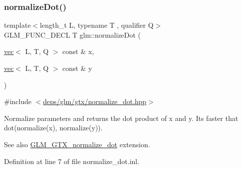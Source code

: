 \subsubsection{\texorpdfstring{normalize\+Dot()}{normalizeDot()}}
{\footnotesize\ttfamily template$<$length\+\_\+t L, typename T , qualifier Q$>$ \\
G\+L\+M\+\_\+\+F\+U\+N\+C\+\_\+\+D\+E\+CL T glm\+::normalize\+Dot (\begin{DoxyParamCaption}\item[{\hyperlink{structglm_1_1vec}{vec}$<$ L, T, Q $>$ const \&}]{x,  }\item[{\hyperlink{structglm_1_1vec}{vec}$<$ L, T, Q $>$ const \&}]{y }\end{DoxyParamCaption})}



{\ttfamily \#include $<$\hyperlink{normalize__dot_8hpp}{deps/glm/gtx/normalize\+\_\+dot.\+hpp}$>$}

Normalize parameters and returns the dot product of x and y. It\textquotesingle{}s faster that dot(normalize(x), normalize(y)).

\begin{DoxySeeAlso}{See also}
\hyperlink{group__gtx__normalize__dot}{G\+L\+M\+\_\+\+G\+T\+X\+\_\+normalize\+\_\+dot} extension. 
\end{DoxySeeAlso}


Definition at line 7 of file normalize\+\_\+dot.\+inl.


